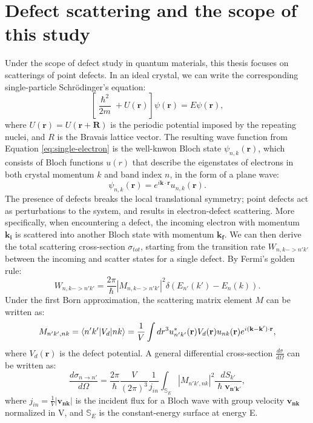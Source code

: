 \section{Defect scattering and the scope of this study}
Under the scope of defect study in quantum materials, this thesis focuses on scatterings of point defects. In an ideal crystal, we can write the corresponding single-particle Schr\"{o}dinger's equation: 
\begin{equation}
	\label{eq:single-electron}
	\left[\frac{\hslash^2}{2m}+U(\mathbf{r})\right]\psi(\mathbf{r}) = E\psi(\mathbf{r}),
\end{equation}
where $U(\mathbf{r})=U(\mathbf{r}+\mathbf{R})$ is the periodic potential imposed by the repeating nuclei, and $R$ is the Bravais lattice vector. 
The resulting wave function from Equation \ref{eq:single-electron} is the well-knwon Bloch state $\psi_{n,k}(\mathbf{r})$, which consists of Bloch functions $u(r)$ that describe the eigenstates of electrons in both crystal momentum $k$ and band index $n$, in the form of a plane wave: 
\begin{equation}
	\psi_{n,k}(\mathbf{r}) = e^{i\mathbf{k}\cdot \mathbf{r}}u_{n,k}(\mathbf{r}).
\end{equation}
The presence of defects breaks the local translational symmetry; point defects act as perturbations to the system, and results in electron-defect scattering. More specifically, when encountering a defect, the incoming electron with momentum $\mathbf{k_i}$ is scattered into another Bloch state with momentum $\mathbf{k_f}$. We can then derive the total scattering cross-section $\sigma_{tot}$, starting from the transition rate $W_{n,k->n'k'}$ between the incoming and scatter states for a single defect. By Fermi's golden rule:
\begin{equation}
	W_{n,k->n'k'} = \frac{2\pi}{\hslash}|M_{n,k->n'k'}|^2\delta(E_{n'}(k')-E_{n}(k)). 
\end{equation}
Under the first Born approximation, the scattering matrix element $M$ can be written as:  
\begin{equation}
	M_{n'k',nk} = \braket{n'k'|V_d|nk} = \frac{1}{V}\int dr^3 \space u_{n'k'}^{*}(\mathbf{r}) V_d(\mathbf{r}) u_{nk}(\mathbf{r})e^{i(\mathbf{k}-\mathbf{k'})\cdot \mathbf{r}},
\end{equation} 
where $V_d(\mathbf{r})$ is the defect potential. A general differential cross-section $\frac{d\sigma}{d\Omega}$ can be written as: 
\begin{equation}
	\label{eq:differential_cross_section}
	\frac{d\sigma_{n\rightarrow n'}}{d\Omega} = \frac{2\pi}{\hslash} \frac{V}{(2\pi)^3}\frac{1}{j_{in}}\int_{\mathbb{S}_E}|M_{n'k',nk}|^2\frac{dS_{k'}}{\hslash \mathbf{v_{n'k'}}},
\end{equation}
where $j_{in} = \frac{1}{V}|\mathbf{v_{nk}}|$ is the incident flux for a Bloch wave with group velocity $\mathbf{v_{nk}}$ normalized in V, and $\mathbb{S}_E$ is the constant-energy surface at energy E. 

